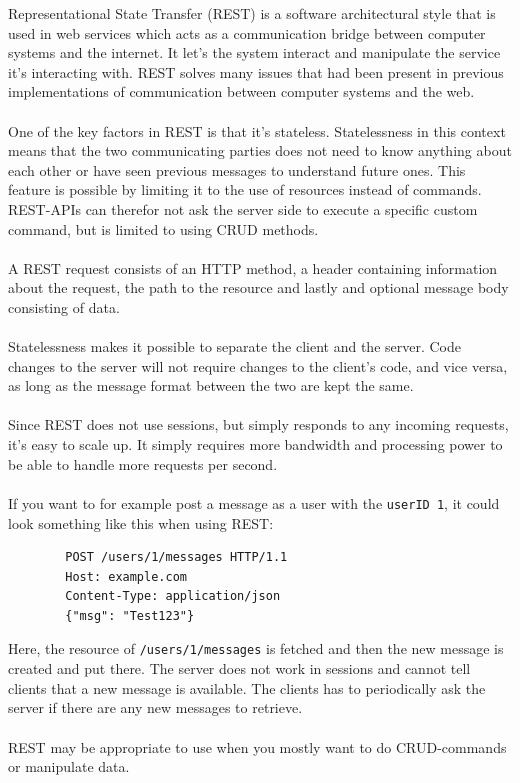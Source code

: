 \documentclass{cslthse-msc}
\begin{document}
    Representational State Transfer (REST) is a software architectural style
    that is used in web services which acts as a communication bridge
    between computer systems and the internet. It let's the system interact
    and manipulate the service it's interacting with. REST solves many
    issues that had been present in previous implementations of
    communication between computer systems and the web.
    \\ \\
    One of the key factors in REST is that it's stateless. Statelessness in
    this context means that the two communicating parties does not need to
    know anything about each other or have seen previous messages to
    understand future ones. This feature is possible by limiting it to the
    use of resources instead of commands. REST-APIs can therefor not ask the
    server side to execute a specific custom command, but is limited to
    using CRUD methods.
    \\ \\
    A REST request consists of an HTTP method, a header containing
    information about the request, the path to the resource and lastly and
    optional message body consisting of data.\citet{rest1}\citet{rest2}
    \\ \\
    Statelessness makes it possible to separate the client and the server.
    Code changes to the server will not require changes to the client's
    code, and vice versa, as long as the message format between the two are
    kept the same.
    \\ \\
    Since REST does not use sessions, but simply responds to any incoming
    requests, it's easy to scale up. It simply requires more bandwidth and
    processing power to be able to handle more requests per second.
    \\ \\
    If you want to for example post a message as a user with the \texttt{userID 1}, it
    could look something like this when using REST:

    \begin{lstlisting}
        POST /users/1/messages HTTP/1.1
        Host: example.com
        Content-Type: application/json
        {"msg": "Test123"}
    \end{lstlisting}

    Here, the resource of \texttt{/users/1/messages} is fetched and then the
    new message is created and put there. The server does not work in
    sessions and cannot tell clients that a new message is available. The
    clients has to periodically ask the server if there are any new messages
    to retrieve.
    \\ \\
    REST may be appropriate to use when you mostly want to do CRUD-commands
    or manipulate data.
\end{document}
